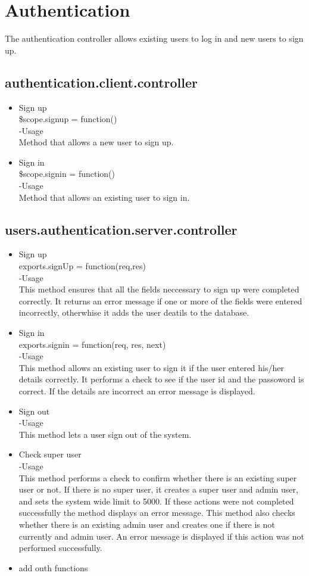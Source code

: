 \documentclass[a4paper,12pt]{article}
\begin{document}
\section{Authentication}
The authentication controller allows existing users to log in and new users to sign up.
\subsection{authentication.client.controller}
 \begin{itemize}
 \item Sign up \\
 \$scope.signup = function()\\
 -Usage\\
 Method that allows a new user to sign up.
 \item Sign in\\
  \$scope.signin = function()\\
 -Usage\\
 Method that allows an existing user to sign in.
 \end{itemize}
 \subsection{users.authentication.server.controller}
 \begin{itemize}
 \item Sign up\\
  exports.signUp = function(req,res)\\
  -Usage\\
  This method ensures that all the fields neccessary to sign up were completed correctly. It returns an error message if one or more of the fields were entered incorrectly, otherwhise it adds the user deatils to the database.
  \item Sign in\\
exports.signin = function(req, res, next) \\
-Usage\\
This method allows an existing user to sign it if the user entered his/her details correctly. It performs a check to see if the user id and the passoword is correct. If the details are incorrect an error message is displayed.
\item Sign out\\
-Usage\\
This method lets a user sign out of the system.
  \item Check super user\\
  -Usage\\
  This method performs a check to confirm whether there is an existing super user or not. If there is no super user, it creates a super user and admin user, and sets the system wide limit to 5000. If these actions were not completed successfully the method displays an error message. This method also checks whether there is an existing admin user and creates one if there is not currently and admin user. An error message is displayed if this action was not performed successfully.
  
  \item add outh functions
 \end{itemize}
 
\end{document}
